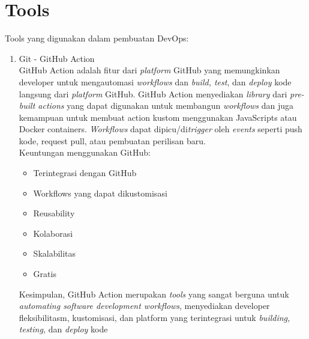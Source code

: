 \section{Tools}
Tools yang digunakan dalam pembuatan DevOps:
\begin{enumerate}
	\item Git - GitHub Action
	\\GitHub Action adalah fitur dari \textit{platform} GitHub yang memungkinkan developer untuk mengautomasi \textit{workflows} dan \textit{build, test}, dan \textit{deploy} kode langsung  dari \textit{platform} GitHub.
	GitHub Action menyediakan \textit{library} dari \textit{pre-built actions }yang dapat digunakan untuk membangun \textit{workflows} dan juga kemampuan untuk membuat action kustom menggunakan JavaScripts atau Docker containers. \textit{Workflows} dapat dipicu/di\textit{trigger} oleh \textit{events} seperti push kode, request pull, atau pembuatan perilisan baru.
	\\Keuntungan menggunakan GitHub:
	\begin{itemize}
		\item Terintegrasi dengan GitHub
		\item Workflows yang dapat dikustomisasi
		\item Reusability
		\item Kolaborasi
		\item Skalabilitas
		\item Gratis
	\end{itemize}
	Kesimpulan, GitHub Action merupakan \textit{tools} yang sangat berguna untuk \textit{automating software development workflows}, menyediakan developer fleksibilitasm, kustomisasi, dan platform yang terintegrasi untuk \textit{building, testing,} dan \textit{deploy} kode
	

\end{enumerate}
